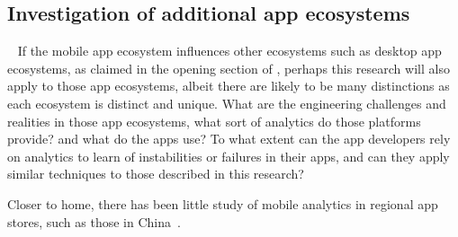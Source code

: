 \subsection{Investigation of additional app ecosystems}~\label{fw-investigate-additional-ecosystems}
If the mobile app ecosystem influences other ecosystems such as desktop app ecosystems, as claimed in the opening section of , perhaps this research will also apply to those app ecosystems, albeit there are likely to be many distinctions as each ecosystem is distinct and unique.  What are the engineering challenges and realities in those app ecosystems, what sort of analytics do those platforms provide? and what do the apps use? To what extent can the app developers rely on analytics to learn of instabilities or failures in their apps, and can they apply similar techniques to those described in this research? 

Closer to home, there has been little study of mobile analytics in regional app stores, such as those in China~.


